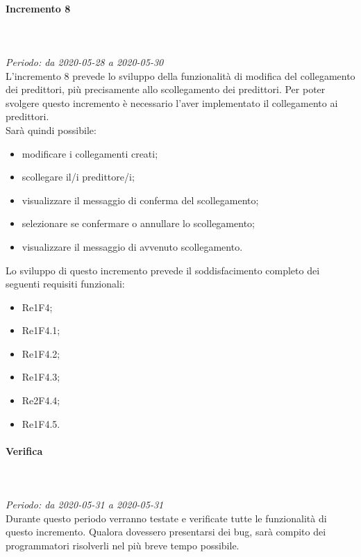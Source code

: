 \paragraph{Incremento 8}\mbox{} \\ \mbox{} \\ 
\textit{Periodo: da 2020-05-28 a 2020-05-30}\\
L’incremento 8 prevede lo sviluppo della funzionalità di modifica del collegamento dei predittori, più precisamente allo scollegamento dei predittori. Per poter svolgere questo incremento è necessario l'aver implementato il collegamento ai predittori. \\
Sarà quindi possibile:
\begin{itemize}
	\item modificare i collegamenti creati;
	\item scollegare il/i predittore/i;
	\item visualizzare il messaggio di conferma del scollegamento;
	\item selezionare se confermare o annullare lo scollegamento;
	\item visualizzare il messaggio di avvenuto scollegamento.
\end{itemize}
Lo sviluppo di questo incremento prevede il soddisfacimento completo dei seguenti requisiti funzionali:
\begin{itemize}
\item Re1F4;
\item Re1F4.1;
\item Re1F4.2;
\item Re1F4.3;
\item Re2F4.4;
\item Re1F4.5.
\end{itemize}
\paragraph*{Verifica}\mbox{} \\ \mbox{} \\ 
\textit{Periodo: da 2020-05-31 a 2020-05-31}\\
Durante questo periodo verranno testate e verificate tutte le funzionalità di questo incremento. Qualora dovessero presentarsi dei bug, sarà compito dei programmatori risolverli nel più breve tempo possibile.


